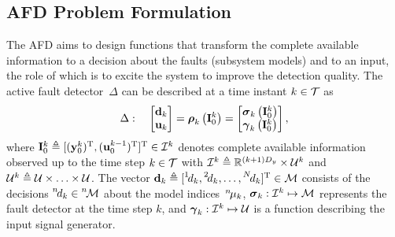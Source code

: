 \documentclass[conference,letterpaper]{IEEEtran}
\def\ist{\prescript{1\!}{}}
\def\iind{\prescript{2\!}{}}
\def\nth{\prescript{n\!}{}}
\def\Nth{\prescript{N\!}{}}
\begin{document}
\subsection{AFD Problem Formulation}\label{sec:AFD_problem_formulation}
The AFD aims to design functions that transform the complete available information to a decision about the faults (subsystem models) and to an input, the role of which is to excite the system to improve the detection quality. 
The active fault detector~$\Delta$ can be described at a time instant $k\in\mathcal{T}$ as
\begin{align}\label{ali:AFDsystem}
  \Delta:\quad
  \begin{bmatrix}
    \mathbf{d}_{k}\\ \mathbf{u}_{k}
  \end{bmatrix} = 
  \boldsymbol{\rho}_{k}\left(\mathbf{I}_{0}^{k}\right) =
  \begin{bmatrix}
    \boldsymbol{\sigma}_{k}\left( \mathbf{I}_0^k\right)\\ \boldsymbol{\gamma}_{k}\left(\mathbf{I}_{0}^{k}\right)
  \end{bmatrix},
\end{align}
where $\mathbf{I}_0^k\triangleq[(\mathbf{y}_{0}^{k})^{\text{T}},(\mathbf{u}_{0}^{k-1})^{\text{T}}]^{\text{T}}\in\mathcal{I}^k$ denotes complete available information observed up to the time step $k\in\mathcal{T}$ with $\mathcal{I}^{k}\triangleq\mathbb{R}^{(k+1)D_y}\times\mathcal{U}^{k}$ and $\mathcal{U}^{k}\triangleq\mathcal{U}\times\ldots\times\mathcal{U}$. 
The vector $\bfd_{k}\triangleq[\ist{d}_k,\iind{d}_k,\ldots,\Nth{d}_k]^{\T}\in\mcM$ consists of the  decisions $\nth{d}_k\in\nth{\mcM}$ about the model indices~$\nth{\mu}_k$, $\boldsymbol{\sigma}_{k}:\mathcal{I}^{k} \mapsto \mathcal{M}$ represents the fault detector at the time step $k$, and $\boldsymbol{\gamma}_{k}:\mathcal{I}^{k} \mapsto \mathcal{U}$ is a function describing the input signal generator. 
\end{document}
